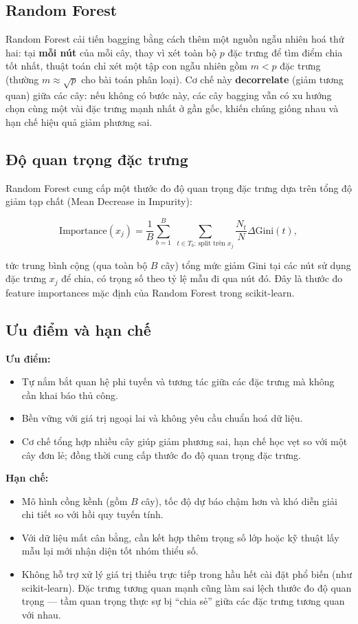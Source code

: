 \documentclass[a4paper]{article}
\newcommand{\code}[1]{{\ttfamily\def\_{\textunderscore\discretionary{}{}{}}#1}}
\def\code#1{#1}%
\def\_{ }%
\begin{document}
\subsection{Random Forest}

Random Forest cải tiến bagging bằng cách thêm một nguồn ngẫu nhiên hoá thứ
hai: tại \textbf{mỗi nút} của mỗi cây, thay vì xét toàn bộ $p$ đặc trưng để tìm
điểm chia tốt nhất, thuật toán chỉ xét một tập con ngẫu nhiên gồm
$m < p$ đặc trưng (thường $m \approx \sqrt{p}$ cho bài toán phân loại). Cơ chế
này \textbf{decorrelate} (giảm tương quan) giữa các cây: nếu không có bước
này, các cây bagging vẫn có xu hướng chọn cùng một vài đặc trưng mạnh nhất ở
gần gốc, khiến chúng giống nhau và hạn chế hiệu quả giảm phương sai.

\subsection{Độ quan trọng đặc trưng}

Random Forest cung cấp một thước đo độ quan trọng đặc trưng dựa trên tổng độ
giảm tạp chất (Mean Decrease in Impurity):

\[
  \text{Importance}(x_j) = \frac{1}{B} \sum_{b=1}^{B} \;
  \sum_{t \in T_b : \, \text{split trên } x_j} \frac{N_t}{N} \Delta\text{Gini}(t),
\]

tức trung bình cộng (qua toàn bộ $B$ cây) tổng mức giảm Gini tại các nút sử
dụng đặc trưng $x_j$ để chia, có trọng số theo tỷ lệ mẫu đi qua nút đó. Đây là
thước đo \code{feature\_importances\_} mặc định của Random Forest trong
scikit-learn.

\subsection{Ưu điểm và hạn chế}

\textbf{Ưu điểm:}
\begin{itemize}[leftmargin=*]
  \item Tự nắm bắt quan hệ phi tuyến và tương tác giữa các đặc trưng mà không
        cần khai báo thủ công.
  \item Bền vững với giá trị ngoại lai và không yêu cầu chuẩn hoá dữ liệu.
  \item Cơ chế tổng hợp nhiều cây giúp giảm phương sai, hạn chế học vẹt so với
        một cây đơn lẻ; đồng thời cung cấp thước đo độ quan trọng đặc trưng.
\end{itemize}

\textbf{Hạn chế:}
\begin{itemize}[leftmargin=*]
  \item Mô hình cồng kềnh (gồm $B$ cây), tốc độ dự báo chậm hơn và khó diễn
        giải chi tiết so với hồi quy tuyến tính.
  \item Với dữ liệu mất cân bằng, cần kết hợp thêm trọng số lớp hoặc kỹ thuật
        lấy mẫu lại mới nhận diện tốt nhóm thiểu số.
  \item Không hỗ trợ xử lý giá trị thiếu trực tiếp trong hầu hết cài đặt phổ
        biến (như scikit-learn). Đặc trưng tương quan mạnh cũng làm sai lệch
        thước đo độ quan trọng --- tầm quan trọng thực sự bị ``chia sẻ'' giữa
        các đặc trưng tương quan với nhau.
\end{itemize}
\end{document}
